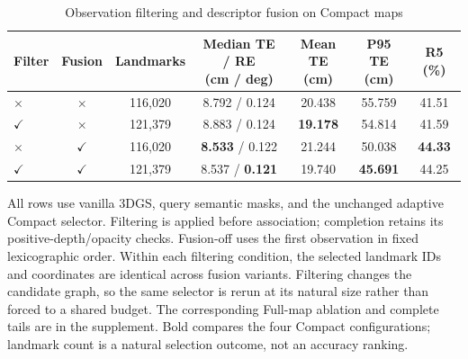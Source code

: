 \begin{table}[tp]
\centering
\footnotesize
\setlength{\tabcolsep}{4pt}
\renewcommand{\arraystretch}{1.12}
\caption{Observation filtering and descriptor fusion on Compact maps}
\label{tab:t6}
\begin{tabular}{lcccccc}
\toprule
Filter & Fusion & Landmarks & \shortstack{Median TE / RE\\(cm / deg)} & \shortstack{Mean TE\\(cm)} & \shortstack{P95 TE\\(cm)} & R5 (\%) \\
\midrule
$\times$ & $\times$ & 116,020 & 8.792 / 0.124 & 20.438 & 55.759 & 41.51 \\
$\checkmark$ & $\times$ & 121,379 & 8.883 / 0.124 & \textbf{19.178} & 54.814 & 41.59 \\
$\times$ & $\checkmark$ & 116,020 & \textbf{8.533} / 0.122 & 21.244 & 50.038 & \textbf{44.33} \\
$\checkmark$ & $\checkmark$ & 121,379 & 8.537 / \textbf{0.121} & 19.740 & \textbf{45.691} & 44.25 \\
\bottomrule
\end{tabular}
\par\smallskip\begin{minipage}{0.98\linewidth}\footnotesize All rows use vanilla 3DGS, query semantic masks, and the unchanged adaptive Compact selector. Filtering is applied before association; completion retains its positive-depth/opacity checks. Fusion-off uses the first observation in fixed lexicographic order. Within each filtering condition, the selected landmark IDs and coordinates are identical across fusion variants. Filtering changes the candidate graph, so the same selector is rerun at its natural size rather than forced to a shared budget. The corresponding Full-map ablation and complete tails are in the supplement. Bold compares the four Compact configurations; landmark count is a natural selection outcome, not an accuracy ranking.\end{minipage}
\end{table}


